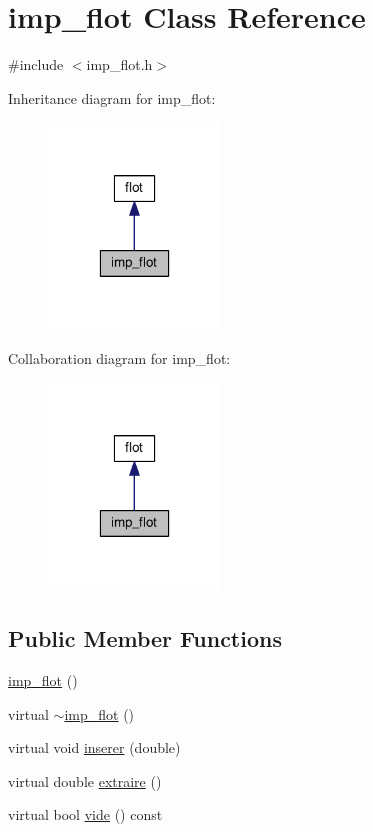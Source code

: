 \hypertarget{classimp__flot}{\section{imp\-\_\-flot Class Reference}
\label{classimp__flot}
}


{\ttfamily \#include $<$imp\-\_\-flot.\-h$>$}



Inheritance diagram for imp\-\_\-flot\-:
\nopagebreak
\begin{figure}[H]
\begin{center}
\leavevmode
\includegraphics[width=130pt]{classimp__flot__inherit__graph}
\end{center}
\end{figure}


Collaboration diagram for imp\-\_\-flot\-:
\nopagebreak
\begin{figure}[H]
\begin{center}
\leavevmode
\includegraphics[width=130pt]{classimp__flot__coll__graph}
\end{center}
\end{figure}
\subsection*{Public Member Functions}
\begin{DoxyCompactItemize}
\item 
\hyperlink{classimp__flot_ada159b4a27063c268afdcfefa0131e0f}{imp\-\_\-flot} ()
\item 
virtual \hyperlink{classimp__flot_ad402e050fd2277f24c92ae3105362b3a}{$\sim$imp\-\_\-flot} ()
\item 
virtual void \hyperlink{classimp__flot_ae8d3f81777edab07b0dccacc630e16e5}{inserer} (double)
\item 
virtual double \hyperlink{classimp__flot_ab3abbb6e555cbc62061bd6bcfda0050c}{extraire} ()
\item 
virtual bool \hyperlink{classimp__flot_a3757d33b984840955902ce982719e0f3}{vide} () const 
\end{DoxyCompactItemize}
